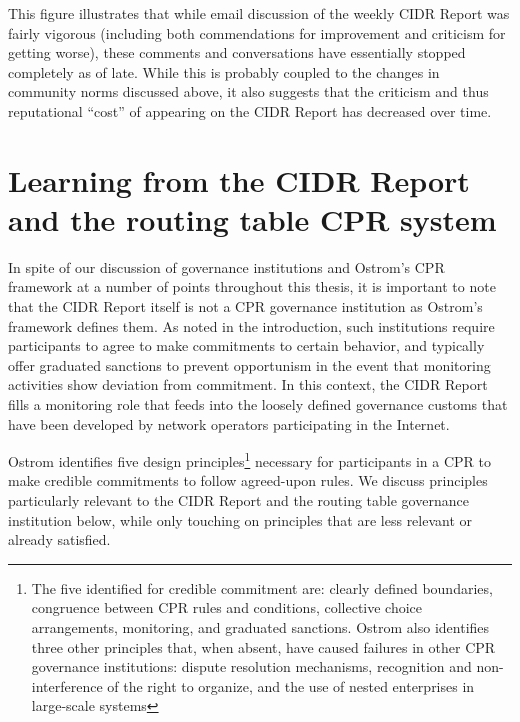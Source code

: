 This figure illustrates that while email discussion of the weekly CIDR Report
was fairly vigorous (including both commendations for improvement and criticism
for getting worse), these comments and conversations have essentially stopped
completely as of late. While this is probably coupled to the changes in
community norms discussed above, it also suggests that the criticism and thus
reputational ``cost'' of appearing on the CIDR Report has decreased over time.

\section{Learning from the CIDR Report and the routing table CPR system}

In spite of our discussion of governance institutions and Ostrom's CPR
framework at a number of points throughout this thesis, it is important to note
that the CIDR Report itself is not a CPR governance institution as Ostrom's
framework defines them. As noted in the introduction, such institutions require
participants to agree to make commitments to certain behavior, and typically
offer graduated sanctions to prevent opportunism in the event that monitoring
activities show deviation from commitment. In this context, the CIDR Report
fills a monitoring role that feeds into the loosely defined governance
customs that have been developed by network operators participating in the
Internet.

Ostrom \cite{Ostrom:1990fv} identifies five design principles\footnote{
The five identified for credible commitment are: clearly defined boundaries,
congruence between CPR rules and conditions, collective choice arrangements,
monitoring, and graduated sanctions. Ostrom also identifies three other
principles that, when absent, have caused failures in other CPR governance
institutions: dispute resolution mechanisms, recognition and non-interference of
the right to organize, and the use of nested enterprises in large-scale
systems}
necessary for participants in a CPR to make credible commitments to
follow agreed-upon rules. We discuss principles particularly relevant to the
CIDR Report and the routing table governance institution below, while only
touching on principles that are less relevant or already satisfied.


